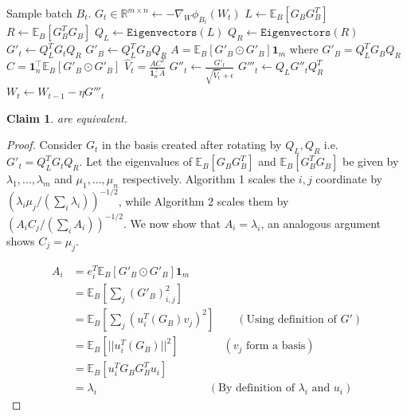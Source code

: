 \documentclass{article}
\newtheorem{claim}{Claim}
\newcommand{\E}{\mathbb{E}}
\begin{document}
\begin{algorithm}[H]

\begin{algorithmic}[1]
    \STATE Sample batch $B_t$.
    \STATE $G_{t} \in \mathbb{R}^{m \times n} \gets -\nabla_W \phi_{B_t}(W_t)$
    \STATE $L \gets \E_{B}[G_{B}G_{B}^T]$
    \STATE $R \gets \E_{B}[G_{B}^TG_{B}]$
    \STATE $Q_L \gets \texttt{Eigenvectors}(L)$
    \STATE $Q_R \gets \texttt{Eigenvectors}(R)$
    \STATE $G'_{t} \gets Q_L^T G_{t} Q_R$
    \STATE {}
    \STATE $G'_{B} \gets Q_L^T G_{B} Q_R$ 
    \STATE $A = \E_{B}[G'_{B} \odot G'_{B}] \mathbf{1}_m$ where $G'_{B} = Q_L^T G_{B} Q_R$
    \STATE $C = \mathbf{1}_n^\top \E_{B}[G'_{B} \odot G'_{B}]$
    \STATE $\hat{V}_t = \frac{A C^T}{\mathbf{1}_n^\top A}$ 
    \STATE $G''_{t} \gets \frac{G'_t}{\sqrt{\hat{V}_t} + \epsilon}$ 
    \STATE $G'''_{t} \gets Q_L G''_{t} Q_R^T$ 
    \STATE $W_t \gets W_{t-1} - \eta G'''_{t}$
\end{algorithmic}
\caption{Single step of idealized Adafactor in Shampoo's eigenspace.}
\label{alg:shampoo_adafactor}
\end{algorithm}

\begin{claim}
\label{claim:eq}
 are equivalent. 
\end{claim}
\begin{proof}

Consider $G_t$ in the basis created after rotating by $Q_L, Q_R$ i.e. $G'_t = Q_L^T G_t Q_R$. Let the eigenvalues of $\E_{B}[G_{B}G_{B}^T]$ and $\E_{B}[G_{B}^TG_{B}]$  be given by $\lambda_1,...,\lambda_m$ and $\mu_1,...,\mu_n$ respectively. Algorithm 1 scales the $i, j$ coordinate by $(\lambda_i \mu_j / (\sum_i \lambda_i))^{-1/2}$, while Algorithm 2 scales them by  $(A_i C_j / (\sum_i A_i))^{-1/2}$. We  now show that $A_i = \lambda_i$, an analogous argument shows $C_j = \mu_j$.

\begin{align*}
    A_i &= e_i^T \E_{B}[G'_{B} \odot G'_{B}] \mathbf{1}_m \\
    &= \E_{B}[ \sum_j (G'_{B})_{i, j}^2] \\
    &= \E_{B}[ \sum_j (u_i^T(G_{B})v_j)^2] \quad \quad (\text{Using definition of } G') \\
    &= \E_{B}[  ||u_i^T(G_{B})||^2] \quad \quad \quad \quad (v_j \text{ form a basis})\\
    &= \E_{B}[ u_i^TG_{B}G_{B}^Tu_i] \\
    &= \lambda_i \quad \quad \quad \quad \quad \quad \quad \quad \quad \quad (\text{By definition of } \lambda_i \text{ and } u_i)
\end{align*}

\end{proof}
\end{document}
